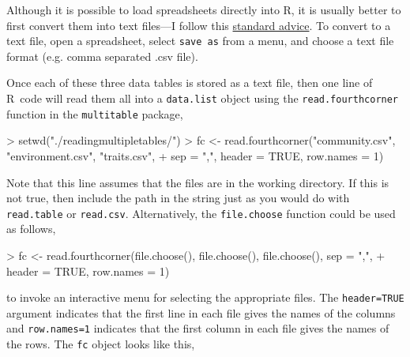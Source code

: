 \documentclass{article}
\newcommand{\R}{{\sf R}}
\newcommand{\code}[1]{\texttt{#1}}
\numberwithin{exercise}{section}
\begin{document}
Although it is possible to load spreadsheets directly into \R, it is usually better to first convert them into text files---I follow this \href{http://cran.r-project.org/doc/manuals/R-data.html#Reading-Excel-spreadsheets}{standard advice}.  To convert to a text file, open a spreadsheet, select \code{save as} from a menu, and choose a text file format (e.g. comma separated .csv file).

Once each of these three data tables is stored as a text file, then one line of \R\ code will read them all into a \code{data.list} object using the \code{read.fourthcorner} function in the \code{multitable} package,
\begin{Schunk}
\begin{Sinput}
> setwd("./readingmultipletables/")
> fc <- read.fourthcorner("community.csv", "environment.csv", "traits.csv", 
+     sep = ",", header = TRUE, row.names = 1)
\end{Sinput}
\end{Schunk}
Note that this line assumes that the files are in the working directory.  If this is not true, then include the path in the string just as you would do with \code{read.table} or \code{read.csv}.  Alternatively, the \code{file.choose} function could be used as follows,
\begin{Schunk}
\begin{Sinput}
> fc <- read.fourthcorner(file.choose(), file.choose(), file.choose(), sep = ",", 
+     header = TRUE, row.names = 1)
\end{Sinput}
\end{Schunk}
to invoke an interactive menu for selecting the appropriate files.  The \code{header=TRUE} argument indicates that the first line in each file gives the names of the columns and \code{row.names=1} indicates that the first column in each file gives the names of the rows.  The \code{fc} object looks like this,
\end{document}
